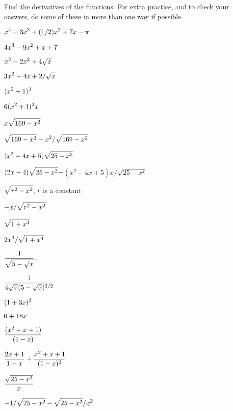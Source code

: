 \begin{exercises}

Find the derivatives of the functions. For extra practice, and to
check your answers, do some of these in more than one way if
possible. 

\twocol

\exercise $\displaystyle x^4-3x^3+(1/2)x^2+7x-\pi$
\begin{answer} $\displaystyle 4x^3-9x^2+x+7$
\end{answer}

\exercise $\displaystyle x^3-2x^2+4\sqrt{x}$
\begin{answer} $\displaystyle 3x^2-4x+2/\sqrt{x}$
\end{answer}

\exercise $\displaystyle (x^2+1)^3$
\begin{answer} $\displaystyle 6(x^2+1)^2x$
\end{answer}

\exercise $\displaystyle x\sqrt{169-x^2}$
\begin{answer} $\displaystyle \sqrt{169-x^2}-x^2/\sqrt{169-x^2}$
\end{answer}

\exercise $\displaystyle (x^2-4x+5)\sqrt{25-x^2}$
\begin{answer} $\displaystyle  (2x-4)\sqrt{25-x^2}-$\hfill\break$(x^2-4x+5)x/\sqrt{25-x^2}$
\end{answer}

\exercise $\displaystyle \sqrt{r^2-x^2}$, $r$ is a constant
\begin{answer} $\displaystyle -x/\sqrt{r^2-x^2}$
\end{answer}

\exercise $\displaystyle \sqrt{1+x^4}$
\begin{answer} $\displaystyle 2x^3/\sqrt{1+x^4}$
\end{answer}

\exercise $\displaystyle \displaystyle{1\over\sqrt{5-\sqrt{x}}}$.
\begin{answer} $\displaystyle{1\over 4\sqrt{x}(5-\sqrt{x})^{3/2}}$
\end{answer}

\exercise $\displaystyle (1+3x)^2$
\begin{answer} $\displaystyle  6+18x$
\end{answer}

\exercise $\displaystyle{(x^2+x+1)\over(1-x)}$
\begin{answer} $\displaystyle {2 x + 1\over1 - x }+{x^2  + x + 1\over(1 - x)^2}$
\end{answer}

\exercise $\displaystyle{\sqrt{25-x^2}\over x}$
\begin{answer} $\displaystyle  -1/\sqrt{25-x^2}-\sqrt{25-x^2}/x^2$
\end{answer}


\end{exercises}

